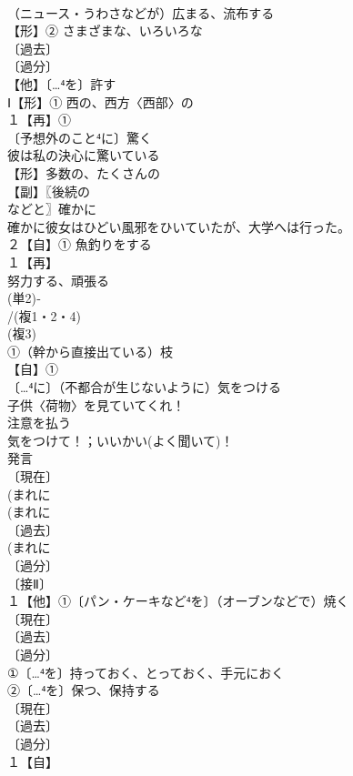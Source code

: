 \documentclass[8pt]{extreport}
\begin{document}
\begin{CJK}{UTF8}{min}
\\	（ニュース・うわさなどが）広まる、流布する
\\	【形】② さまざまな、いろいろな
\\	〔過去〕
\\	〔過分〕
\\	【他】〔…⁴を〕許す 
\\	Ⅰ【形】① 西の、西方〈西部〉の 
\\	１【再】①
\\	〔予想外のこと⁴に〕驚く 
\\	彼は私の決心に驚いている 
\\	【形】多数の、たくさんの
\\	【副】〖後続の
\\	などと〗確かに 
\\	確かに彼女はひどい風邪をひいていたが、大学へは行った。
\\	２【自】① 魚釣りをする
\\	１【再】
\\	努力する、頑張る
\\	(単2)‐
\\	/(複1・2・4)
\\	(複3)
\\	①（幹から直接出ている）枝
\\	【自】①
\\	〔…⁴に〕（不都合が生じないように）気をつける 
\\	子供〈荷物〉を見ていてくれ！ 
\\	注意を払う　
\\	気をつけて！；いいかい(よく聞いて)！
\\	発言
\\	〔現在〕
\\	(まれに
\\	(まれに
\\	〔過去〕
\\	(まれに
\\	〔過分〕
\\	〔接Ⅱ〕
\\	１【他】①〔パン・ケーキなど⁴を〕（オーブンなどで）焼く 
\\	〔現在〕
\\	〔過去〕
\\	〔過分〕
\\	①〔…⁴を〕持っておく、とっておく、手元におく 
\\	②〔…⁴を〕保つ、保持する
\\	〔現在〕
\\	〔過去〕
\\	〔過分〕
\\	１【自】

\end{CJK}
\end{document}
